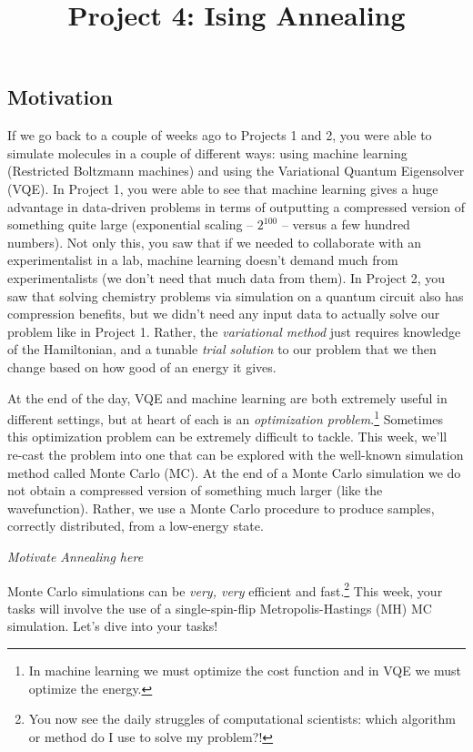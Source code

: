 \documentclass[12pt]{article}
\title{Project 4: Ising Annealing}
\begin{document}
\maketitle

\thispagestyle{empty}

\subsection*{Motivation}

If we go back to a couple of weeks ago to Projects 1 and 2, you were able to simulate molecules in a couple of different ways: using machine learning (Restricted Boltzmann machines) and using the Variational Quantum Eigensolver (VQE). In Project 1, you were able to see that machine learning gives a huge advantage in data-driven problems in terms of outputting a compressed version of something quite large (exponential scaling -- $2^{100}$ -- versus a few hundred numbers). Not only this, you saw that if we needed to collaborate with an experimentalist in a lab, machine learning doesn't  demand much from experimentalists (we don't need that much data from them). In Project 2, you saw that solving chemistry problems via simulation on a quantum circuit also has compression benefits, but we didn't need any input data to actually solve our problem like in Project 1. Rather, the {\it variational method} just requires knowledge of the Hamiltonian, and a tunable {\it trial solution} to our problem that we then change based on how good of an energy it gives.

At the end of the day, VQE and machine learning are both extremely useful in different settings, but at heart of each is an {\it optimization problem}.\footnote{In machine learning we must optimize the cost function and in VQE we must optimize the energy.} Sometimes this optimization problem can be extremely difficult to tackle. 
This week, we'll re-cast the problem into one that can be explored with the well-known simulation method called Monte Carlo (MC). 
At the end of a Monte Carlo simulation we do not obtain a compressed version of something much larger (like the wavefunction).
Rather, we use a Monte Carlo procedure to produce samples, correctly distributed, from a low-energy state.

{\it Motivate Annealing here}

Monte Carlo simulations can be {\it very, very} efficient and fast.\footnote{You now see the daily struggles of computational scientists: which algorithm or method do I use to solve my problem?!} This week, your tasks will involve the use of a single-spin-flip Metropolis-Hastings (MH) MC simulation. Let's dive into your tasks!
\end{document}
